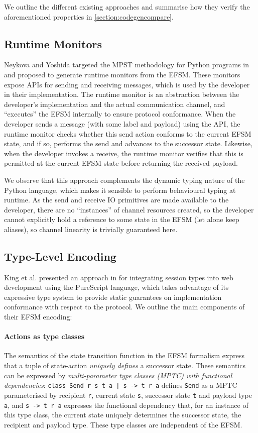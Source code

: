 We outline the different existing approaches and summarise how they verify the aforementioned properties in {\ref{section:codegencompare}}.

\subsection{Runtime Monitors}
Neykova and Yoshida targeted the MPST methodology for Python programs in \cite{Python2017} and proposed to generate {runtime monitors} from the EFSM. These monitors expose APIs for sending and receiving messages, which is used by the developer in their implementation. The runtime monitor is an abstraction between the developer's implementation and the actual communication channel, and ``executes'' the EFSM internally to ensure protocol conformance. When the developer sends a message (with some label and payload) using the API, the runtime monitor checks whether this send action conforms to the current EFSM state, and if so, performs the send and advances to the successor state. Likewise, when the developer invokes a receive, the runtime monitor verifies that this is permitted at the current EFSM state before returning the received payload.

We observe that this approach complements the dynamic typing nature of the Python language, which makes it sensible to perform behavioural typing at runtime. As the send and receive IO primitives are made available to the developer, there are no ``instances'' of channel resources created, so the developer cannot explicitly hold a reference to some state in the EFSM (let alone keep aliases), so channel linearity is trivially guaranteed here.

\subsection{Type-Level Encoding}
King et al. presented an approach in \cite{PureScript2019} for integrating session types into web development using the PureScript language, which takes advantage of its expressive type system to provide static guarantees on implementation conformance with respect to the protocol. We outline the main components of their EFSM encoding:

\paragraph{Actions as type classes} The semantics of the state transition function in the EFSM formalism express that a tuple of state-action \textit{uniquely defines} a successor state. These semantics can be expressed by \textit{multi-parameter type classes (MPTC) with functional dependencies}: \texttt{class Send r s t a | s -> t r a} defines \texttt{Send} as a MPTC parameterised by recipient \texttt{r}, current state \texttt{s}, successor state \texttt{t} and payload type \texttt{a}, and \texttt{s -> t r a} expresses the functional dependency that, for an instance of this type class, the current state uniquely determines the successor state, the recipient and payload type. These type classes are independent of the EFSM.

